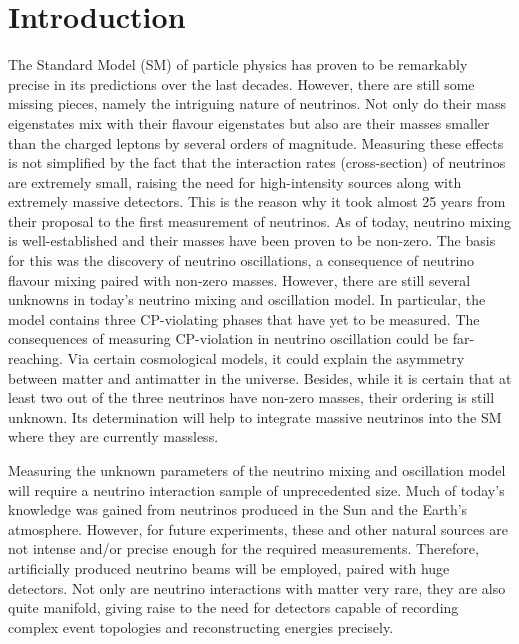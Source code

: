 \chapter{Introduction}
\label{chap:introduction}

The Standard Model (SM) of particle physics has proven to be remarkably precise in its predictions over the last decades.
However, there are still some missing pieces, namely the intriguing nature of neutrinos.
Not only do their mass eigenstates mix with their flavour eigenstates but also are their masses smaller than the charged leptons by several orders of magnitude.
Measuring these effects is not simplified by the fact that the interaction rates (cross-section) of neutrinos are extremely small, raising the need for high-intensity sources along with extremely massive detectors.
This is the reason why it took almost \num{25} years from their proposal to the first measurement of neutrinos.
As of today, neutrino mixing is well-established and their masses have been proven to be non-zero.
The basis for this was the discovery of neutrino oscillations, a consequence of neutrino flavour mixing paired with non-zero masses.
However, there are still several unknowns in today's neutrino mixing and oscillation model.
In particular, the model contains three CP-violating phases that have yet to be measured.
The consequences of measuring CP-violation in neutrino oscillation could be far-reaching.
Via certain cosmological models, it could explain the asymmetry between matter and antimatter in the universe.
Besides, while it is certain that at least two out of the three neutrinos have non-zero masses, their ordering is still unknown.
Its determination will help to integrate massive neutrinos into the SM where they are currently massless.

Measuring the unknown parameters of the neutrino mixing and oscillation model will require a neutrino interaction sample of unprecedented size.
Much of today's knowledge was gained from neutrinos produced in the Sun and the Earth's atmosphere.
However, for future experiments, these and other natural sources are not intense and/or precise enough for the required measurements.
Therefore, artificially produced neutrino beams will be employed, paired with huge detectors.
Not only are neutrino interactions with matter very rare, they are also quite manifold, giving raise to the need for detectors capable of recording complex event topologies and reconstructing energies precisely.

